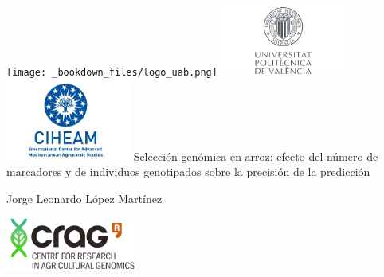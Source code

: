 \documentclass[11pt,spanish,a4paper,oneside,]{book} %
\begin{document}
\clearpage
\thispagestyle{empty}
\begin{center}
\texttt{[image: \_bookdown\_files/logo\_uab.png]} \includegraphics[width=41mm]{_bookdown_files/logo_upv.jpg} \includegraphics[width=41mm]{_bookdown_files/logo_ciheam.jpg} \newline
\vspace{\baselineskip}
\Huge{Selección genómica en arroz: efecto del número de marcadores y de individuos genotipados sobre la precisión de la predicción}\par
\vspace{\baselineskip}
\par %
\vspace{\baselineskip}
{\Large Jorge Leonardo López Martínez}\par
\vspace{\baselineskip}
\hfill\includegraphics[width=44mm]{_bookdown_files/logo_crag.png}\hspace*{\fill} \newline
\end{center}
\end{document}
